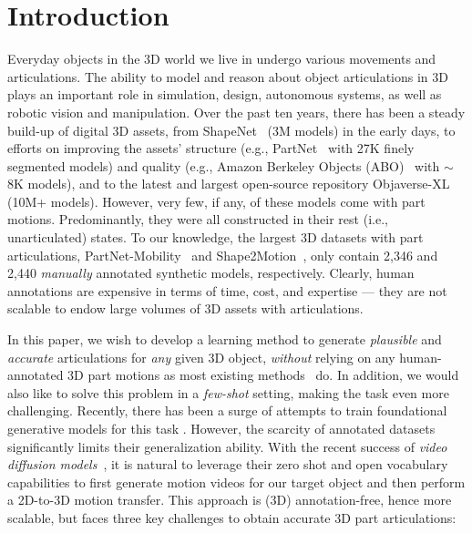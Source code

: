 \section{Introduction}
\label{sec:intro}

Everyday objects in the 3D world we live in undergo various movements and articulations. The ability to model and reason about object articulations in 3D plays an important role in simulation, design, autonomous systems, as well as robotic vision and manipulation.
%
Over the past ten years, there has been a steady build-up of digital 3D assets, from ShapeNet~\cite{chang2015shapenet} (3M models)  in the early days, to efforts on improving the assets' structure (e.g., PartNet~\cite{mo2019partnet} with 27K finely segmented models) and quality (e.g., Amazon Berkeley Objects (ABO)~\cite{collins2022abo} with $\sim$8K models), and to the latest and largest open-source repository Objaverse-XL~\cite{deitke2023objaversexluniverse10m3d} (10M+ models).
However, very few, if any, of these models come with part motions. Predominantly, they were all constructed in their rest (i.e., unarticulated) states. To our knowledge, the largest 3D datasets with part articulations, PartNet-Mobility~\cite{xiang2020sapien} and 
Shape2Motion~\cite{wang2019shape2motion}, only contain 2,346 and 2,440 {\em manually\/} annotated synthetic models, respectively. Clearly, human annotations are expensive in terms of time, cost, and expertise --- they are not scalable to endow large volumes of 3D assets with articulations. 

In this paper, we wish to develop a learning method to generate {\em plausible\/} and {\em accurate\/} articulations for {\em any\/} given 3D object, {\em without\/} relying on any human-annotated 3D part motions as most existing methods~\cite{hu2017learning,wang2019shape2motion,abbatematteo2019learning,mo2021where2act,jain2021screwnet,yan2020rpm,jiang2022opd} do. In addition, we would also like to solve this problem in a {\em few-shot\/} setting, making the task even more challenging. Recently, there has been a surge of attempts to train foundational generative models for this task \cite{li2024dragapart, li2024puppet}. However, the scarcity of annotated datasets significantly limits their generalization ability.
%
With the recent success of {\em video diffusion models\/}~\cite{blattmann2023stable,wang2024vc,xing2024dynamicrafter,guo2023animatediff}, it is natural to leverage their zero shot and open vocabulary capabilities to first generate motion videos for our target object and then perform a 2D-to-3D motion transfer. This approach is (3D) annotation-free, hence more scalable, but faces three key challenges to obtain accurate 3D part articulations:

